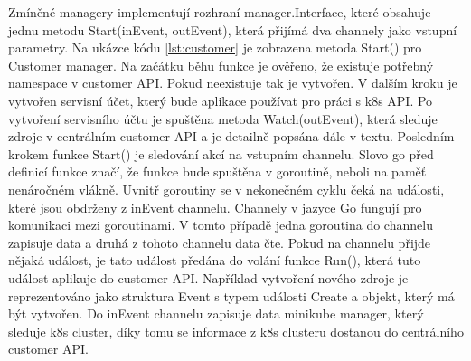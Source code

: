 Zmíněné managery implementují rozhraní manager.Interface, které obsahuje jednu metodu Start(inEvent, outEvent), která přijímá dva channely jako vstupní parametry. Na ukázce kódu \ref{lst:customer} je zobrazena metoda Start() pro Customer manager. Na začátku běhu funkce je ověřeno, že existuje potřebný namespace v customer API. Pokud neexistuje tak je vytvořen. V dalším kroku je vytvořen servisní účet, který bude aplikace používat pro práci s k8s API. Po vytvoření servisního účtu je spuštěna metoda Watch(outEvent), která sleduje zdroje v centrálním customer API a je detailně popsána dále v textu. Posledním krokem funkce Start() je sledování akcí na vstupním channelu. Slovo go před definicí funkce značí, že funkce bude spuštěna v goroutině, neboli \linebreak na paměť nenáročném vlákně. Uvnitř goroutiny se v nekonečném cyklu čeká \linebreak na události, které jsou obdrženy z inEvent channelu. Channely v jazyce Go fungují pro komunikaci mezi goroutinami. V tomto případě jedna goroutina do channelu zapisuje data a druhá z tohoto channelu data čte. Pokud na channelu přijde nějaká událost, je tato událost předána do volání funkce Run(), která tuto událost aplikuje do customer API. Například vytvoření nového zdroje je reprezentováno jako struktura Event s typem události Create a objekt, který má být vytvořen. Do inEvent channelu zapisuje data minikube manager, který sleduje k8s cluster, díky tomu se informace z k8s clusteru dostanou do centrálního customer API.


